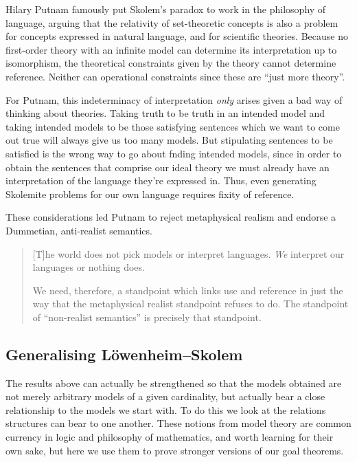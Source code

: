 \documentclass[10pt, a4paper, oneside]{article}
\theoremstyle{definition}
\theoremstyle{remark}
\theoremstyle{plain}
\theoremstyle{plain}
\begin{document}
Hilary Putnam \citeyearpar{putnam1980} famously put Skolem's paradox to work in
the philosophy of language, arguing that the relativity of set-theoretic
concepts is also a problem for concepts expressed in natural language, and for
scientific theories. Because no first-order theory with an infinite model can
determine its interpretation up to isomorphism, the theoretical constraints
given by the theory cannot determine reference. Neither can operational
constraints since these are ``just more theory''.

For Putnam, this indeterminacy of interpretation \emph{only} arises given a bad
way of thinking about theories. Taking truth to be truth in an intended model
and taking intended models to be those satisfying sentences which we want to
come out true will always give us too many models. But stipulating sentences to
be satisfied is the wrong way to go about fnding intended models, since in order
to obtain the sentences that comprise our ideal theory we must already have an
interpretation of the language they're expressed in. Thus, even generating
Skolemite problems for our own language requires fixity of reference.

These considerations led Putnam to reject metaphysical realism and endorse a
Dummetian, anti-realist semantics.

\begin{quote}
    [T]he world does not pick models or interpret languages. \emph{We} interpret
    our languages or nothing does.
    
    We need, therefore, a standpoint which links use and reference in just the
    way that the metaphysical realist standpoint refuses to do. The standpoint
    of ``non-realist semantics'' is precisely that standpoint.
    \citep[p. 482]{putnam1980}
\end{quote}

\subsection{Generalising Löwenheim--Skolem}

The results above can actually be strengthened so that the models obtained are
not merely arbitrary models of a given cardinality, but actually bear a close
relationship to the models we start with. To do this we look at the relations
structures can bear to one another. These notions from model theory are common
currency in logic and philosophy of mathematics, and worth learning for their
own sake, but here we use them to prove stronger versions of our goal theorems.
\end{document}
